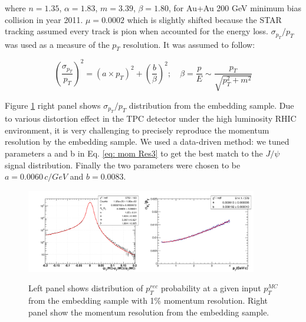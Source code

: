where $n=1.35$, $\alpha=1.83$, $m=3.39$, $\beta=1.80$, for Au+Au
200 GeV minimum bias collision in year 2011. $\mu=0.0002$ which is
slightly shifted because the STAR tracking assumed every track is
pion when accounted for the energy loss. $\sigma_{p_{T}}/p_{T}$ was
used as a measure of the $p_{T}$ resolution. It was assumed to follow:

\begin{equation}
(\frac{\sigma_{p_{T}}}{p_{T}})^{2}=(a\times p_{T})^{2}+(\frac{b}{\beta})^{2};\quad\beta=\frac{p}{E}\sim\frac{p_{T}}{\sqrt{p_{T}^{2}+m^{2}}}\label{eq: mom Res3}
\end{equation}


Figure \ref{fig:mom Res} right panel shows $\sigma_{p_{T}}/p_{T}$
distribution from the embedding sample. Due to various distortion
effect in the TPC detector under the high luminosity RHIC environment,
it is very challenging to precisely reproduce the momentum resolution
by the embedding sample. We used a data-driven method: we tuned parameters
a and b in Eq. \ref{eq: mom Res3} to get the best match to the $J/\psi$
signal distribution. Finally the two parameters were chosen to be
$a=0.0060\, c/GeV$ and $b=0.0083$. 

\begin{figure}
\begin{centering}
\includegraphics[width=0.45\textwidth]{fig/3.Analysis/Efficiency/momRes/momShape}\includegraphics[width=0.45\textwidth]{fig/3.Analysis/Efficiency/momRes/PtRes}
\par\end{centering}

\protect\caption{Left panel shows distribution of $p_{T}^{rec}$ probability at a given
input $p_{T}^{MC}$ from the embedding sample with 1\% momentum resolution.
Right panel show the momentum resolution from the embedding sample.}


\label{fig:mom Res}
\end{figure}



